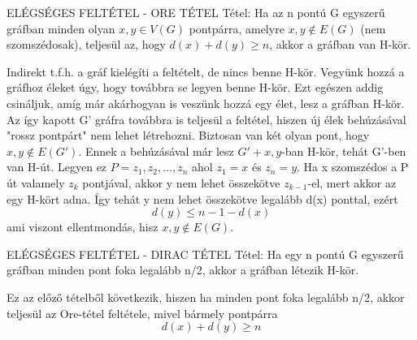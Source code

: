 \documentclass[]{article}
\begin{document}
\begin{framed}
ELÉGSÉGES FELTÉTEL - ORE TÉTEL Tétel: Ha az n pontú G egyszerű gráfban minden olyan $x,y\in V(G)$ pontpárra, amelyre ${x,y}\not\in E(G)$ (nem szomszédosak), teljesül az, hogy $d(x) + d(y) \geq n$, akkor a gráfban van H-kör.
\end{framed}
\begin{leftbar}
Indirekt t.f.h. a gráf kielégíti a feltételt, de nincs benne H-kör. Vegyünk hozzá a gráfhoz éleket úgy, hogy továbbra se legyen benne H-kör. Ezt egészen addig csináljuk, amíg már akárhogyan is veszünk hozzá egy élet, lesz a gráfban H-kör. Az így kapott G' gráfra továbbra is teljesül a feltétel, hiszen új élek behúzásával "rossz pontpárt" nem lehet létrehozni. Biztosan van két olyan pont, hogy ${x,y} \not \in E(G')$. Ennek a behúzásával már lesz $G' + {x,y}$-ban H-kör, tehát G'-ben van H-út. Legyen ez $P = {z_1, z_2,...,z_n}$ ahol $z_1 = x$ és $z_n = y$.
Ha x szomszédos a P út valamely $z_k$ pontjával, akkor y nem lehet összekötve $z_{k-1}$-el, mert akkor az egy H-kört adna. Így tehát y nem lehet összekötve legalább d(x) ponttal, ezért
$$d(y) \leq n - 1 - d(x)$$
ami viszont ellentmondás, hisz ${x,y} \not\in E(G)$.
\end{leftbar}
\begin{framed}
ELÉGSÉGES FELTÉTEL - DIRAC TÉTEL Tétel: Ha egy n pontú G egyszerű gráfban minden pont foka legalább n/2, akkor a gráfban létezik H-kör.
\end{framed}
\begin{leftbar}
Ez az előző tételből következik, hiszen ha minden pont foka legalább n/2, akkor teljesül az Ore-tétel feltétele, mivel bármely pontpárra $$d(x) + d(y) \geq n$$
\end{leftbar}
\end{document}
